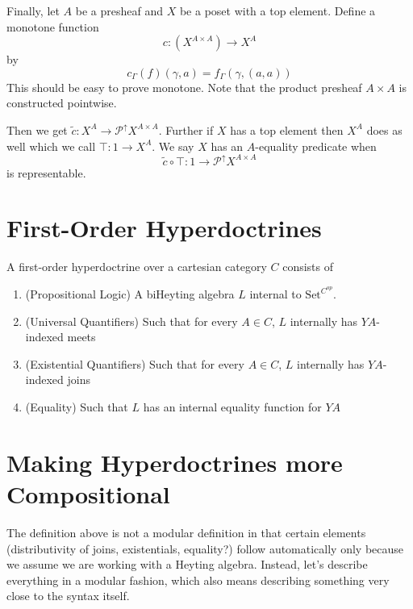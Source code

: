 \documentclass{article}
\newcommand{\upsets}{\mathcal P^{\uparrow}}
\newcommand{\Set}{\textrm{Set}}
\begin{document}
Finally, let $A$ be a presheaf and $X$ be a poset with a top
element. Define a monotone function
\[ c : (X^{A \times A}) \to X^A \]
by
\[ c_\Gamma(f)(\gamma, a) = f_\Gamma(\gamma , (a, a)) \]
This should be easy to prove monotone. Note that the product presheaf
$A \times A$ is constructed pointwise.

Then we get $\widetilde c : X^A \to \upsets X^{A\times A}$. Further if $X$
has a top element then $X^A$ does as well which we call $\top : 1 \to
X^A$. We say $X$ has an $A$-equality predicate when
\[ \widetilde c \circ \top : 1 \to \upsets X^{A\times A} \]
is representable.

\section{First-Order Hyperdoctrines}

A first-order hyperdoctrine over a cartesian category $C$ consists of
\begin{enumerate}
\item (Propositional Logic) A biHeyting algebra $L$ internal to $\Set^{C^{op}}$.
\item (Universal Quantifiers) Such that for every $A \in C$, $L$ internally has $YA$-indexed meets
\item (Existential Quantifiers) Such that for every $A \in C$, $L$ internally has $YA$-indexed joins
\item (Equality) Such that $L$ has an internal equality function for $YA$
\end{enumerate}

\section{Making Hyperdoctrines more Compositional}

The definition above is not a modular definition in that certain
elements (distributivity of joins, existentials, equality?) follow
automatically only because we assume we are working with a Heyting
algebra. Instead, let's describe everything in a modular fashion,
which also means describing something very close to the syntax itself.
\end{document}
